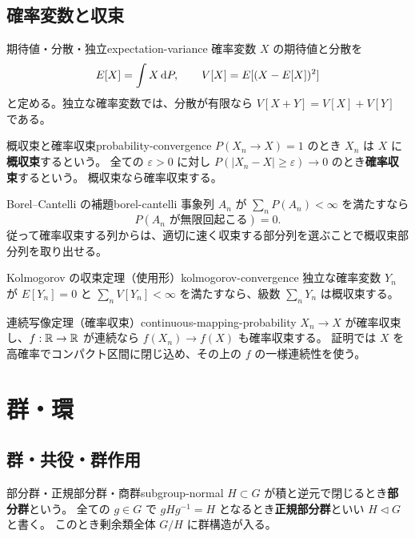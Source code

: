 \section{確率変数と収束}

\begin{definition}{期待値・分散・独立}{expectation-variance}
確率変数 $X$ の期待値と分散を
\[
 E[X]=\int X\,\mathrm{d} P,
 \qquad V[X]=E[(X-E[X])^2]
\]
と定める。独立な確率変数では、分散が有限なら
$V[X+Y]=V[X]+V[Y]$ である。
\end{definition}

\begin{definition}{概収束と確率収束}{probability-convergence}
$P(X_n\to X)=1$ のとき $X_n$ は $X$ に\textbf{概収束}するという。
全ての $\varepsilon>0$ に対し
$P(|X_n-X|\ge\varepsilon)\to0$ のとき\textbf{確率収束}するという。
概収束なら確率収束する。
\end{definition}

\begin{theorem}{Borel--Cantelli の補題}{borel-cantelli}
事象列 $A_n$ が $\sum_nP(A_n)<\infty$ を満たすなら
\[
 P(A_n\text{ が無限回起こる})=0.
\]
従って確率収束する列からは、適切に速く収束する部分列を選ぶことで概収束部分列を取り出せる。
\end{theorem}

\begin{theorem}{Kolmogorov の収束定理（使用形）}{kolmogorov-convergence}
独立な確率変数 $Y_n$ が $E[Y_n]=0$ と
$\sum_nV[Y_n]<\infty$ を満たすなら、級数 $\sum_nY_n$ は概収束する。
\end{theorem}

\begin{theorem}{連続写像定理（確率収束）}{continuous-mapping-probability}
$X_n\to X$ が確率収束し、$f:\mathbb{R}\to\mathbb{R}$ が連続なら $f(X_n)\to f(X)$ も確率収束する。
証明では $X$ を高確率でコンパクト区間に閉じ込め、その上の $f$ の一様連続性を使う。
\end{theorem}

\chapter{群・環}
\label{ch:algebra}

\section{群・共役・群作用}

\begin{definition}{部分群・正規部分群・商群}{subgroup-normal}
$H\subset G$ が積と逆元で閉じるとき\textbf{部分群}という。
全ての $g\in G$ で $gHg^{-1}=H$ となるとき\textbf{正規部分群}といい $H\triangleleft G$ と書く。
このとき剰余類全体 $G/H$ に群構造が入る。
\end{definition}

